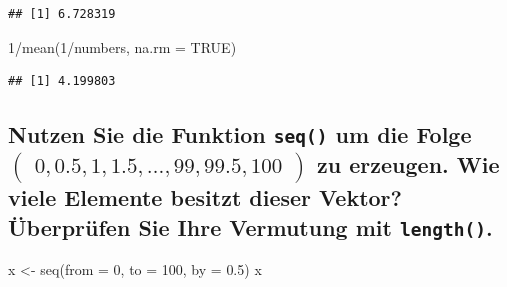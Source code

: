 \documentclass[12pt,a4paper]{article}
\newenvironment{Shaded}{\begin{snugshade}}{\end{snugshade}}
\newcommand{\AttributeTok}[1]{\textcolor[rgb]{0.77,0.63,0.00}{#1}}
\newcommand{\ConstantTok}[1]{\textcolor[rgb]{0.00,0.00,0.00}{#1}}
\newcommand{\DecValTok}[1]{\textcolor[rgb]{0.00,0.00,0.81}{#1}}
\newcommand{\FloatTok}[1]{\textcolor[rgb]{0.00,0.00,0.81}{#1}}
\newcommand{\FunctionTok}[1]{\textcolor[rgb]{0.00,0.00,0.00}{#1}}
\newcommand{\NormalTok}[1]{#1}
\newcommand{\OtherTok}[1]{\textcolor[rgb]{0.56,0.35,0.01}{#1}}
\newcommand{\SpecialCharTok}[1]{\textcolor[rgb]{0.00,0.00,0.00}{#1}}
\begin{document}
\begin{verbatim}
## [1] 6.728319
\end{verbatim}

\begin{Shaded}
\begin{Highlighting}[]
    \DecValTok{1}\SpecialCharTok{/}\FunctionTok{mean}\NormalTok{(}\DecValTok{1}\SpecialCharTok{/}\NormalTok{numbers, }\AttributeTok{na.rm =} \ConstantTok{TRUE}\NormalTok{)}
\end{Highlighting}
\end{Shaded}

\begin{verbatim}
## [1] 4.199803
\end{verbatim}

\vspace{0.5cm}

\hypertarget{nutzen-sie-die-funktion-um-die-folge-beginpmatrix-0-0.5-1-1.5-ldots-99-99.5-100-endpmatrix-zu-erzeugen.-wie-viele-elemente-besitzt-dieser-vektor-uxfcberpruxfcfen-sie-ihre-vermutung-mit-.}{%
\subsection{\texorpdfstring{Nutzen Sie die Funktion \texttt{seq()} um
die Folge
\linebreak \(\begin{pmatrix} 0, 0.5, 1, 1.5, \ldots, 99, 99.5, 100 \end{pmatrix}\)
zu erzeugen. Wie viele Elemente besitzt dieser Vektor? Überprüfen Sie
Ihre Vermutung mit
\texttt{length()}.}{Nutzen Sie die Funktion  um die Folge \textbackslash begin\{pmatrix\} 0, 0.5, 1, 1.5, \textbackslash ldots, 99, 99.5, 100 \textbackslash end\{pmatrix\} zu erzeugen. Wie viele Elemente besitzt dieser Vektor? Überprüfen Sie Ihre Vermutung mit .}}\label{nutzen-sie-die-funktion-um-die-folge-beginpmatrix-0-0.5-1-1.5-ldots-99-99.5-100-endpmatrix-zu-erzeugen.-wie-viele-elemente-besitzt-dieser-vektor-uxfcberpruxfcfen-sie-ihre-vermutung-mit-.}}

\begin{Shaded}
\begin{Highlighting}[]
\NormalTok{    x }\OtherTok{\textless{}{-}} \FunctionTok{seq}\NormalTok{(}\AttributeTok{from =} \DecValTok{0}\NormalTok{, }\AttributeTok{to =} \DecValTok{100}\NormalTok{, }\AttributeTok{by =} \FloatTok{0.5}\NormalTok{)}
\NormalTok{    x}
\end{Highlighting}
\end{Shaded}
\end{document}
